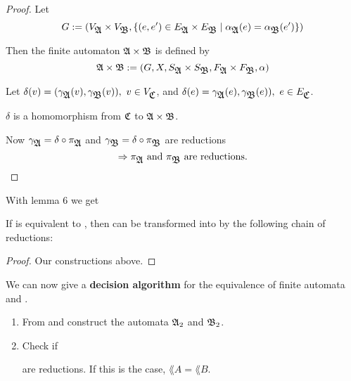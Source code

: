 \begin{proof}
Let \[ G := (V_{\mbox{$\mathfrak{A}$}} \times V_{\mbox{$\mathfrak{B}$}}, \{ (e, e') \in E_{\mbox{$\mathfrak{A}$}} \times
E_{\mbox{$\mathfrak{B}$}} \mid \alpha_{\mbox{$\mathfrak{A}$}}(e) = \alpha_{\mbox{$\mathfrak{B}$}}(e') \}  ) \]

Then the finite automaton $\mbox{$\mathfrak{A}$} \times \mbox{$\mathfrak{B}$}$ is defined by
\[ \mbox{$\mathfrak{A}$} \times \mbox{$\mathfrak{B}$} := (G, X, S_{\mbox{$\mathfrak{A}$}} \times S_{\mbox{$\mathfrak{B}$}}, F_{\mbox{$\mathfrak{A}$}}
\times F_{\mbox{$\mathfrak{B}$}}, \alpha) \]

Let $\delta(v) = (\gamma_{\mbox{$\mathfrak{A}$}}(v), \gamma_{\mbox{$\mathfrak{B}$}}(v)),\ v \in V_{\mbox{$\mathfrak{C}$}}$,
and $\delta(e) = \gamma_{\mbox{$\mathfrak{A}$}}(e), \gamma_{\mbox{$\mathfrak{B}$}}(e)),\ e \in E_{\mbox{$\mathfrak{C}$}}$.

$\delta$ is a homomorphism from $\mbox{$\mathfrak{C}$}$ to $\mbox{$\mathfrak{A}$} \times \mbox{$\mathfrak{B}$}$.

Now $\gamma_{\mbox{$\mathfrak{A}$}} = \delta \circ \pi_{\mbox{$\mathfrak{A}$}}$ and $\gamma_{\mbox{$\mathfrak{B}$}} = \delta
\circ \pi_{\mbox{$\mathfrak{B}$}}$ are reductions
\[ \Rightarrow \pi_{\mbox{$\mathfrak{A}$}} \mbox{ and } \pi_{\mbox{$\mathfrak{B}$}} \mbox{ are reductions.} \]
\end{proof}

With lemma 6 we get

\begin{theorem}
If  is equivalent to , then  can be transformed into  by
the following chain of reductions:
\begin{center}
\end{center}
\end{theorem}

\begin{proof}
Our constructions above.
\end{proof}

We can now give a {\bf decision algorithm} for the equivalence of finite
automata  and .

\begin{enumerate}
  \item From  and  construct the automata $\mbox{$\mathfrak{A}$}_2$ and $\mbox{$\mathfrak{B}$}_2$.
  \item Check if 
	are reductions. If this is the case, $\lang{A} = \lang{B}$.
\end{enumerate}

